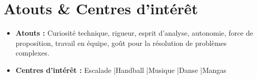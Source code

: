 \documentclass[a4paper,11pt]{article}
\begin{document}
\vspace{1pt}

\section{Atouts \& Centres d'intérêt}
\begin{itemize}[leftmargin=*, nosep, label=\tiny$\bullet$]
    \item \small{\textbf{Atouts :} Curiosité technique, rigueur, esprit d'analyse, autonomie, force de proposition, travail en équipe, goût pour la résolution de problèmes complexes.}
    \item \small{\textbf{Centres d'intérêt :} Escalade \quad|\quad Handball \quad|\quad Musique \quad|\quad Danse \quad|\quad Mangas}
\end{itemize}
\end{document}
